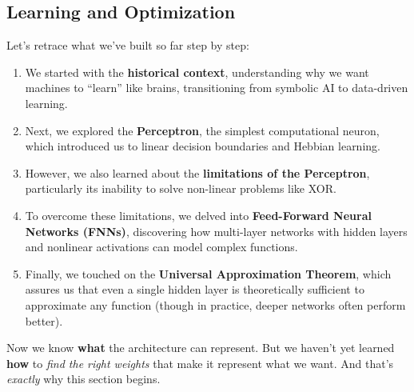 \subsection{Learning and Optimization}

Let's retrace what we've built so far step by step:
\begin{enumerate}
    \item We started with the \textbf{historical context}, understanding why we want machines to ``learn'' like brains, transitioning from symbolic AI to data-driven learning.
    \item Next, we explored the \textbf{Perceptron}, the simplest computational neuron, which introduced us to linear decision boundaries and Hebbian learning.
    \item However, we also learned about the \textbf{limitations of the Perceptron}, particularly its inability to solve non-linear problems like XOR.
    \item To overcome these limitations, we delved into \textbf{Feed-Forward Neural Networks (FNNs)}, discovering how multi-layer networks with hidden layers and nonlinear activations can model complex functions.
    \item Finally, we touched on the \textbf{Universal Approximation Theorem}, which assures us that even a single hidden layer is theoretically sufficient to approximate any function (though in practice, deeper networks often perform better).
\end{enumerate}
Now we know \textbf{what} the architecture can represent. But we haven't yet learned \textbf{how} to \emph{find the right weights} that make it represent what we want. And that's \emph{exactly} why this section begins.

